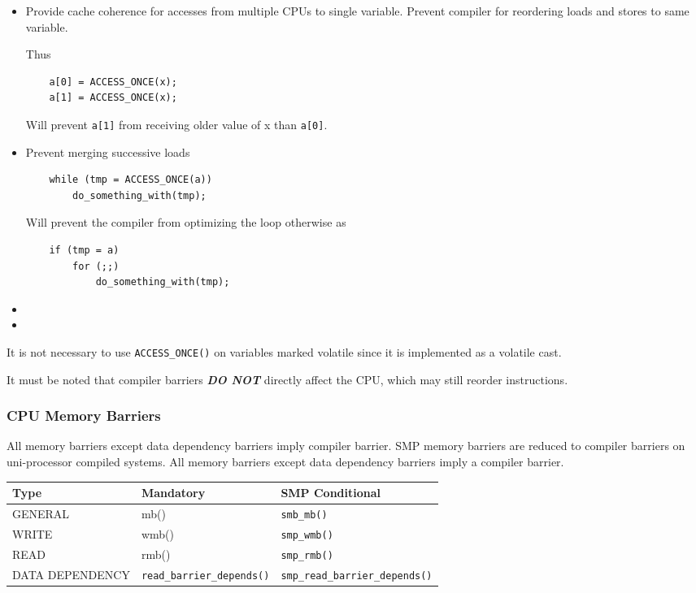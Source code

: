 \documentclass{article}
\begin{document}
\begin{itemize}
\item Provide cache coherence for accesses from multiple CPUs to
  single variable. Prevent compiler for reordering loads and stores to
  same variable.
  
  Thus
  \begin{lstlisting}
    a[0] = ACCESS_ONCE(x);
    a[1] = ACCESS_ONCE(x);
  \end{lstlisting}
  Will prevent \lstinline{a[1]} from receiving older value of x than
  \lstinline{a[0]}.

\item Prevent merging successive loads

  \begin{lstlisting}
    while (tmp = ACCESS_ONCE(a))
		do_something_with(tmp);
  \end{lstlisting}

  Will prevent the compiler from optimizing the loop otherwise as

  \begin{lstlisting}    
	if (tmp = a)
		for (;;)
			do_something_with(tmp);
  \end{lstlisting}

\item 
  
\item
\end{itemize}

It is not necessary to use \lstinline{ACCESS_ONCE()} on variables
marked volatile since it is implemented as a volatile cast.

It must be noted that compiler barriers \textbf{\emph{DO NOT}}
directly affect the CPU, which may still reorder instructions.


\subsubsection{CPU Memory Barriers}

All memory barriers except data dependency barriers imply compiler
barrier. SMP memory barriers are reduced to compiler barriers on
uni-processor compiled systems. All memory barriers except data
dependency barriers imply a compiler barrier.

\begin{center}
  \begin{tabular}{ l| l | l }    
    \hline
    Type & Mandatory & SMP Conditional \\ \hline
    GENERAL & mb() & \lstinline{smb_mb()} \\ 
    WRITE & wmb() & \lstinline{smp_wmb()}  \\ 
    READ &  rmb() & \lstinline{smp_rmb()}  \\
    DATA DEPENDENCY &  \lstinline{read_barrier_depends()} & \lstinline{smp_read_barrier_depends()} \\
    \hline
  \end{tabular}
\end{center}
\end{document}
